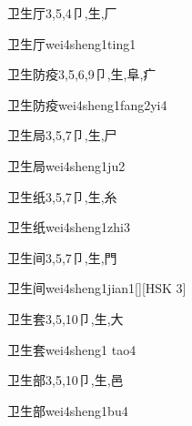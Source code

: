 \begin{Entry}{卫生厅}{3,5,4}{⼙,⽣,⼚}
  \begin{Phonetics}{卫生厅}{wei4sheng1ting1}
  \end{Phonetics}
\end{Entry}

\begin{Entry}{卫生防疫}{3,5,6,9}{⼙,⽣,⾩,⽧}
  \begin{Phonetics}{卫生防疫}{wei4sheng1fang2yi4}
  \end{Phonetics}
\end{Entry}

\begin{Entry}{卫生局}{3,5,7}{⼙,⽣,⼫}
  \begin{Phonetics}{卫生局}{wei4sheng1ju2}
  \end{Phonetics}
\end{Entry}

\begin{Entry}{卫生纸}{3,5,7}{⼙,⽣,⽷}
  \begin{Phonetics}{卫生纸}{wei4sheng1zhi3}
  \end{Phonetics}
\end{Entry}

\begin{Entry}{卫生间}{3,5,7}{⼙,⽣,⾨}
  \begin{Phonetics}{卫生间}{wei4sheng1jian1}[][HSK 3]
  \end{Phonetics}
\end{Entry}

\begin{Entry}{卫生套}{3,5,10}{⼙,⽣,⼤}
  \begin{Phonetics}{卫生套}{wei4sheng1 tao4}
  \end{Phonetics}
\end{Entry}

\begin{Entry}{卫生部}{3,5,10}{⼙,⽣,⾢}
  \begin{Phonetics}{卫生部}{wei4sheng1bu4}
  \end{Phonetics}
\end{Entry}


